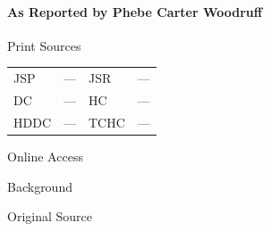 			\paragraph{As Reported by Phebe Carter Woodruff}
				\label{EMS-1840-JS-3-5-OCT-1840-PW}
				
				\begin{description}
					\item[Print Sources]
				\end{description}

				\begin{tabular}{p{0.5in}p{1in}p{0.5in}p{1in}}
					JSP	 	& ---		& JSR 		& --- \\
					DC	 	& ---		& HC 		& --- \\
					HDDC 	& ---		& TCHC 		& --- \\
				\end{tabular}
				
				\begin{description}
					\item[Online Access] \phantom{.}
				\end{description}
				
				\begin{description}
					\item[Background]
				\end{description}
				
				
				\begin{description}
					\item[Original Source]
				\end{description}
				
